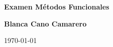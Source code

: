 \begin{titlepage}
   \begin{center}
       \vspace*{1cm}

       \textbf{Examen Métodos Funcionales}

       \vspace{0.5cm}
        
            
       \vspace{1.5cm}

       \textbf{Blanca Cano Camarero}

       \vfill
            
       
            
       \vspace{0.8cm}
     
       
            
       \today
            
   \end{center}
\end{titlepage}